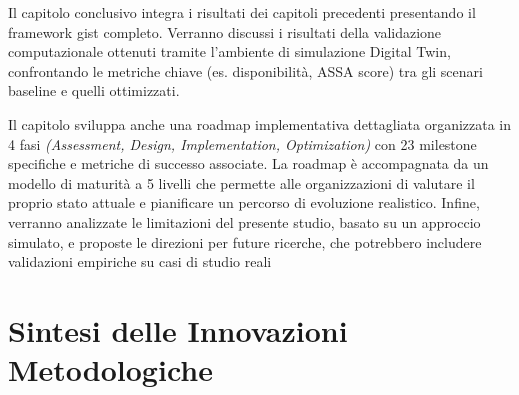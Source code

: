 




Il capitolo conclusivo integra i risultati dei capitoli precedenti presentando il framework \gls{gist} completo. Verranno discussi i risultati della validazione computazionale ottenuti tramite l'ambiente di simulazione Digital Twin, confrontando le metriche chiave (es. disponibilità, ASSA score) tra gli scenari baseline e quelli ottimizzati. 

Il capitolo sviluppa anche una roadmap implementativa dettagliata organizzata in 4 fasi \emph{(Assessment, Design, Implementation, Optimization)} con 23 milestone specifiche e metriche di successo associate. La roadmap è accompagnata da un modello di maturità a 5 livelli che permette alle organizzazioni di valutare il proprio stato attuale e pianificare un percorso di evoluzione realistico.
Infine, verranno analizzate le limitazioni del presente studio, basato su un approccio simulato, e proposte le direzioni per future ricerche, che potrebbero includere validazioni empiriche su casi di studio reali

\section{\texorpdfstring{\textbf{Sintesi delle Innovazioni Metodologiche}}{1.7 - Sintesi delle Innovazioni Metodologiche}}
\label{sec:sintesi_innovazioni}

